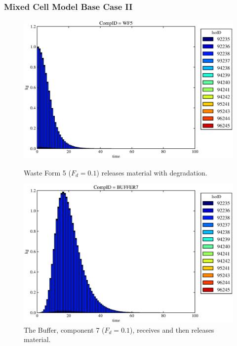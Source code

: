 \begin{frame}[ctb!]
  \frametitle{Mixed Cell Model Base Case II}
  \begin{figure}
\begin{minipage}[b]{0.45\linewidth}

  \includegraphics[width=\textwidth]{./images/mcIII1.eps}
  \caption[MCI Waste Form Contaminants.]{
    Waste Form 5 ($F_d = 0.1$) releases material with degradation. 
    }
  \label{fig:mcIIIwf5}
  
  \includegraphics[width=\textwidth]{./images/mcIII3.eps}
  \caption[Case MCI Buffer Contaminants]{
    The Buffer, component 7 ($F_d=0.1$), receives and then releases material.
    }
  \label{fig:mcIIIbuff}


\end{minipage}
\end{figure}
\end{frame}
